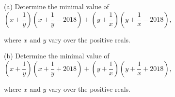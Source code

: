 (a) Determine the minimal value of$\displaystyle\left(x+\dfrac{1}{y}\right)\left(x+\dfrac{1}{y}-2018\right)+\left(y+\dfrac{1}{x}\right)\left(y+\dfrac{1}{x}-2018\right), $

where $x$ and $y$ vary over the positive reals.

(b) Determine the minimal value of$\displaystyle\left(x+\dfrac{1}{y}\right)\left(x+\dfrac{1}{y}+2018\right)+\left(y+\dfrac{1}{x}\right)\left(y+\dfrac{1}{x}+2018\right), $

where $x$ and $y$ vary over the positive reals.